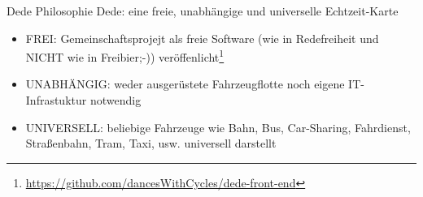 
\bgroup


\begin{frame}{Dede Philosophie}
  Dede: eine freie, unabhängige und universelle Echtzeit-Karte
  \begin{itemize}
  \item FREI: Gemeinschaftsprojejt als freie Software (wie in Redefreiheit und NICHT wie in Freibier;-)) veröffenlicht\footnote{\url{https://github.com/dancesWithCycles/dede-front-end}}
  \item UNABHÄNGIG: weder ausgerüstete Fahrzeugflotte noch eigene IT-Infrastuktur notwendig
  \item UNIVERSELL: beliebige Fahrzeuge wie Bahn, Bus, Car-Sharing, Fahrdienst, Straßenbahn, Tram, Taxi, usw. universell darstellt
  \end{itemize}
\end{frame}

\egroup
